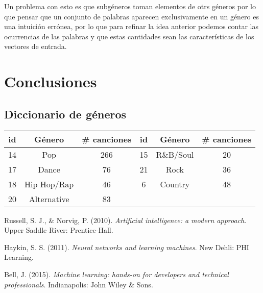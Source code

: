 \documentclass[spanish,11pt,letterpaper]{article}
\begin{document}
Un problema con esto es que subgéneros toman elementos de otrs
géneros por lo que pensar
que un conjunto de palabras aparecen exclusivamente en un género es una intuición errónea,
por lo que para refinar la idea anterior podemos contar las ocurrencias de las palabras
y que estas cantidades sean las características de los vectores de entrada.

\section{Conclusiones}

\begin{appendices}
\section{Diccionario de géneros}
\begin{center}
\begin{tabular}{|c|c|c||c|c|c|}
\hline
id & Género & \# canciones & id & Género & \# canciones\\
\hline
14 & Pop & 266 & 15 & R\&B/Soul & 20 \\
17 & Dance & 76 & 21 & Rock & 36 \\
18 & Hip Hop/Rap & 46 & 6 & Country & 48 \\
20 & Alternative & 83 & & & \\
\hline
\end{tabular}
\end{center}
\end{appendices}

\begin{thebibliography}{9}
Russell, S. J., \& Norvig, P. (2010).
\textit{Artificial intelligence: a modern approach}.
Upper Saddle River: Prentice-Hall.

Haykin, S. S. (2011).
\textit{Neural networks and learning machines}.
New Dehli: PHI Learning.

Bell, J. (2015).
\textit{Machine learning: hands-on for developers and technical professionals}.
Indianapolis: John Wiley \& Sons.
\end{thebibliography}
\end{document}
